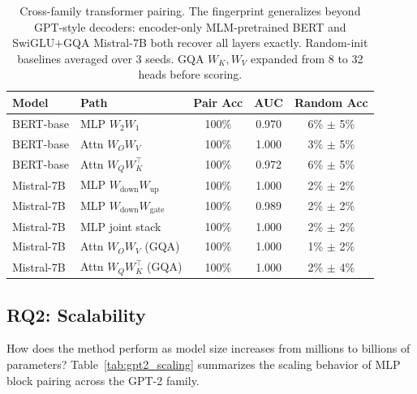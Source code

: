 \documentclass[wcp]{jmlr}
\begin{document}
\begin{table}[h]
\centering
\small
\renewcommand{\arraystretch}{1.05}
\begin{tabular}{llccc}
\toprule
Model & Path & Pair Acc & AUC & Random Acc \\
\midrule
BERT-base   & MLP $W_2 W_1$              & 100\% & 0.970 & 6\% $\pm$ 5\% \\
BERT-base   & Attn $W_O W_V$             & 100\% & 1.000 & 3\% $\pm$ 5\% \\
BERT-base   & Attn $W_Q W_K^\top$        & 100\% & 0.972 & 6\% $\pm$ 5\% \\
\midrule
Mistral-7B  & MLP $W_{\text{down}} W_{\text{up}}$    & 100\% & 1.000 & 2\% $\pm$ 2\% \\
Mistral-7B  & MLP $W_{\text{down}} W_{\text{gate}}$  & 100\% & 0.989 & 2\% $\pm$ 2\% \\
Mistral-7B  & MLP joint stack                         & 100\% & 1.000 & 2\% $\pm$ 2\% \\
Mistral-7B  & Attn $W_O W_V$ (GQA)        & 100\% & 1.000 & 1\% $\pm$ 2\% \\
Mistral-7B  & Attn $W_Q W_K^\top$ (GQA)   & 100\% & 1.000 & 2\% $\pm$ 4\% \\
\bottomrule
\end{tabular}
\caption{Cross-family transformer pairing. The fingerprint generalizes beyond GPT-style decoders: encoder-only MLM-pretrained BERT and SwiGLU+GQA Mistral-7B both recover all layers exactly. Random-init baselines averaged over 3 seeds. GQA $W_K,W_V$ expanded from 8 to 32 heads before scoring.}
\label{tab:transformer_family}
\end{table}

\subsection{RQ2: Scalability}

How does the method perform as model size increases from millions to billions of parameters? Table~\ref{tab:gpt2_scaling} summarizes the scaling behavior of MLP block pairing across the GPT-2 family.
\end{document}

